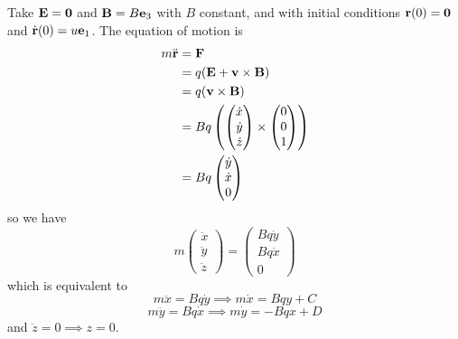 \documentclass[10pt, a4paper]{article}
\begin{document}
\begin{example}
    Take $\mathbf{E} = \mathbf{0}$ and $\mathbf{B} = B\mathbf{e}_3$ with $B$ constant,
    and with initial conditions $\mathbf{r}(0) = \mathbf{0}$ and $\dot{\mathbf{r}}(0) = u\mathbf{e}_1$.
    The equation of motion is
    \begin{align*}
        m\ddot{\mathbf{r}} &= \mathbf{F} \\
        &= q(\mathbf{E} + \mathbf{v} \times \mathbf{B}) \\
        &= q(\mathbf{v} \times \mathbf{B}) \\
        &= Bq\left(\begin{pmatrix}
            \dot{x} \\ \dot{y} \\ \dot{z}
        \end{pmatrix} \times \begin{pmatrix}
            0 \\ 0 \\ 1
        \end{pmatrix}\right) \\
        &= Bq\begin{pmatrix}
            \dot{y} \\ \dot{x} \\ 0
        \end{pmatrix}
    \end{align*}
    so we have
    \[
    m\begin{pmatrix}
        \ddot{x} \\
        \ddot{y} \\
        \ddot{z}
    \end{pmatrix} = \begin{pmatrix}
        Bq\dot{y} \\
        Bq\dot{x} \\
        0
    \end{pmatrix}
    \]
    which is equivalent to
    \[
    m\ddot{x} = Bq\dot{y} \implies m\dot{x} = Bqy + C
    \]
    \[
    m\ddot{y} = Bq\dot{x} \implies m\dot{y} = -Bqx + D
    \]
    and
    $\ddot{z} = 0 \implies z = 0$.


\end{example}
\end{document}
